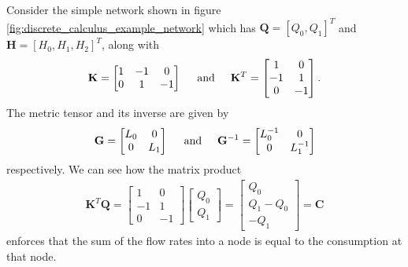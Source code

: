 \documentclass[12pt]{article}
\begin{document}
Consider the simple network shown in figure \ref{fig:discrete_calculus_example_network} which has $\mathbf{Q} = [Q_0, Q_1]^T$ and $\mathbf{H} = [H_0, H_1, H_2]^T$, along with
\begin{align*}
\mathbf{K} = \begin{bmatrix}
1 & -1 & 0 \\
0 & 1 & -1
\end{bmatrix}
\hspace{0.5cm} \text{and} \hspace{0.5cm} \mathbf{K}^T = \begin{bmatrix}
1 & 0  \\
-1 & 1 \\
0 & -1
\end{bmatrix}.
\end{align*}
The metric tensor and its inverse are given by 
\begin{align*}
\mathbf{G} = \begin{bmatrix}
L_0 & 0  \\
0 & L_1 
\end{bmatrix} \hspace{0.5cm} \text{and} \hspace{0.5cm} \mathbf{G}^{-1} = \begin{bmatrix}
L_0^{-1} & 0  \\
0 & L_1^{-1} \\
\end{bmatrix}
\end{align*}
respectively. We can see how the matrix product 
\begin{align*}
\mathbf{K}^T \mathbf{Q} = \begin{bmatrix}
1 & 0  \\
-1 & 1 \\
0 & -1
\end{bmatrix} \begin{bmatrix}
Q_0 \\ Q_1
\end{bmatrix} = \begin{bmatrix}
Q_0 \\ Q_1 - Q_0 \\ -Q_1
\end{bmatrix} = \mathbf{C}
\end{align*}
enforces that the sum of the flow rates into a node is equal to the consumption at that node. 
\end{document}
